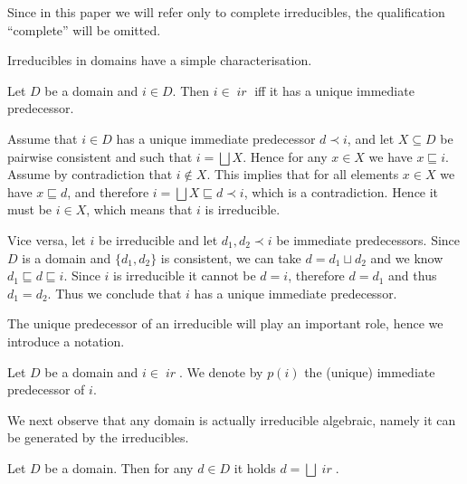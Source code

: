 \documentclass[conference]{IEEEtran}
\renewenvironment{proof}{\begin{IEEEproof}}{\end{IEEEproof}}
\newcommand{\principal}[1]{\ensuremath{\mathop{\downarrow\!{#1}}}}
\newcommand{\ir}[1]{\ensuremath{\mathop{\mathit{ir}({#1})}}}
\newcommand{\pred}[1]{\ensuremath{\mathit{p}({#1})}}
\begin{document}
Since in this paper we will refer only to complete irreducibles, the qualification ``complete'' will be omitted.



Irreducibles in domains have a simple characterisation.

\begin{lemma}
  \label{le:unique-pred}
  Let $D$ be a domain and $i \in D$. Then $i \in \ir{D}$ 
  iff it has a unique immediate predecessor.
\end{lemma}


\begin{proof}
  Assume that $i \in D$ has a unique immediate predecessor
  $d \prec i$, and let $X \subseteq D$ be pairwise consistent and
  such that $ i = \bigsqcup X$. Hence for any $x \in X$ we have
  $x \sqsubseteq i$. Assume by contradiction that $i \not\in X$. This
  implies that for all elements $x \in X$ we have $x \sqsubseteq d$, and therefore
  $i= \bigsqcup X \sqsubseteq d \prec i$, which is a contradiction.
  Hence it must be $i \in X$, which means that $i$ is irreducible.

  Vice versa, let $i$ be irreducible and let $d_1, d_2 \prec i$ be
  immediate predecessors. Since $D$ is a domain and $\{ d_1, d_2 \}$
  is consistent, we can take $d = d_1 \sqcup d_2$ and we know
  $d_1 \sqsubseteq  d \sqsubseteq i$. Since $i$ is irreducible it cannot be
  $d = i$, therefore $d = d_1$ and thus $d_1 = d_2$. Thus we conclude that
  $i$ has a unique immediate predecessor.
\end{proof}

The unique predecessor of an irreducible will play an important role, hence we introduce a notation.

\begin{definition}
  Let $D$ be a domain and $i \in \ir{D}$. We denote by $\pred{i}$ the
  (unique) immediate predecessor of $i$.
\end{definition}

We next observe that any domain is actually irreducible algebraic, namely it can be generated by the irreducibles.

\begin{proposition}
  \label{pr:domains-irr-alg}
  Let $D$ be a domain. Then for any $d \in D$ it holds
  $d = \bigsqcup \ir{d}$.
\end{proposition}
\end{document}

